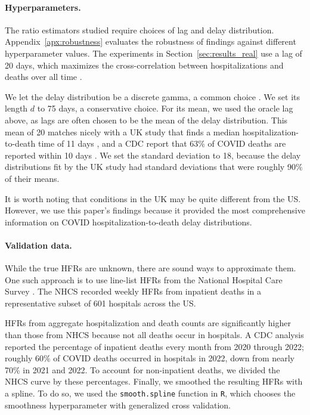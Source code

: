 \documentclass{article}
\newcommand{\djmcomment}[1]{{\color{teal}[DJM: #1]}}
\begin{document}
\paragraph{Hyperparameters.}
The ratio estimators studied require choices of lag and delay distribution. 
Appendix~\ref{apx:robustness} evaluates the
robustness of findings against different hyperparameter values. The experiments
in Section~\ref{sec:results_real} use a lag of 20 days, which maximizes the
cross-correlation between hospitalizations and deaths over all time
\citep{atlantic}. 

We let the delay distribution be a discrete gamma, a common
choice \citet{delay_distrs}. We set its length $d$ to 75 days, a conservative choice. 
For its mean, we used the oracle lag above, as lags are often chosen to be the
mean of the delay distribution. This mean of 20 matches nicely with a UK study that finds a median hospitalization-to-death time of 11 days \citep{UKdelay},
and a CDC report that 63\% of COVID deaths are reported within 10 days
\citep{cdc_deaths_demographic_geographic_2023}. 
We set the standard deviation to 18, because the delay distributions fit by the UK study had standard deviations that were roughly 90\% of their means. 

It is worth noting that conditions in the UK may be quite different from the US. However, we use this paper's findings because it provided the most comprehensive information on COVID hospitalization-to-death delay distributions.

\paragraph{Validation data.}
While the true HFRs are unknown, there are sound ways to approximate them. One such approach is to use line-list HFRs from the National Hospital Care Survey \citep{NHCS2023}. The NHCS recorded weekly HFRs from inpatient deaths in a representative subset of 601 hospitals across the US.

HFRs from aggregate hospitalization and death counts are significantly higher than those from NHCS because not all deaths occur in hospitals. A CDC analysis reported the percentage of inpatient deaths every month from 2020 through 2022; roughly 60\% of COVID deaths occurred in hospitals in 2022, down from nearly 70\% in 2021 and 2022. To account for non-inpatient deaths, we divided the NHCS curve by these percentages. Finally, we smoothed the resulting HFRs with a spline. To do so, we used the \texttt{smooth.spline} function in \texttt{R}, which chooses the smoothness hyperparameter with generalized cross validation. 
\end{document}
